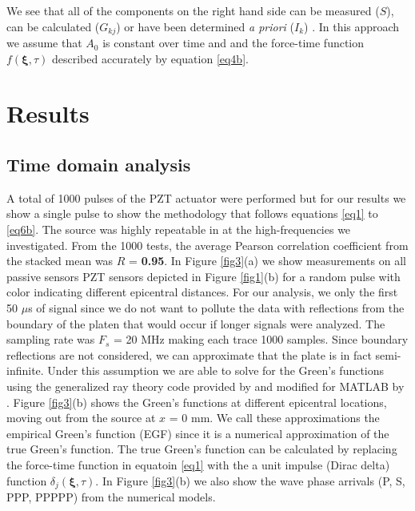 \documentclass[preprint,3p, 11pt,authoryear]{elsarticle}
\begin{document}
{\noindent We see that all of the components on the right hand side can be measured ($S$), can be calculated ($G_{kj}$) or have been determined \textit{a priori} ($I_{k}$) . In this approach we assume that $A_{0}$ is constant over time and and the force-time function $f(\mathbf{\xi}, \tau)$ described accurately by equation \eqref{eq4b}.

\section{Results}
\label{results}
\subsection{Time domain analysis}
A total of 1000 pulses of the PZT actuator were performed but for our results we show a single pulse to show the methodology that follows equations \eqref{eq1} to \eqref{eq6b}.  The source was highly repeatable in at the high-frequencies we investigated.  From the 1000 tests, the average  Pearson correlation coefficient from the stacked mean was $R$ = \textbf{0.95}. In Figure \ref{fig3}(a) we show measurements on all passive sensors PZT sensors depicted in Figure \ref{fig1}(b) for a random pulse with color indicating different epicentral distances. For our analysis, we only the first 50 $\mu$s of signal since we do not want to pollute the data with reflections from the boundary of the platen that would occur if longer signals were analyzed. The sampling rate was $F_{s}$ = 20 MHz making each trace 1000 samples. Since boundary reflections are not considered, we can approximate that the plate is in fact semi-infinite. Under this assumption we are able to solve for the Green's functions using the generalized ray theory code provided by \citet{Hsu1985} and modified for MATLAB by \citet{McLaskey2012}.  Figure \ref{fig3}(b) shows the Green's functions at different epicentral locations, moving out from the source at $x$ = 0 mm. We call these approximations the empirical Green's function (EGF) since it is a numerical approximation of the true Green's function.  The true Green's function can be calculated by replacing the force-time function in equatoin \eqref{eq1} with the a unit impulse (Dirac delta) function $\delta_{j}(\mathbf{\xi}, \tau)$. In Figure \ref{fig3}(b) we also show the wave phase arrivals (P, S, PPP, PPPPP) from the numerical models.

}
\end{document}
